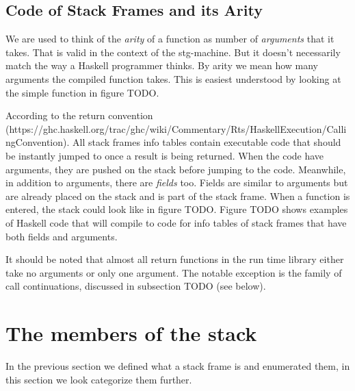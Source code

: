 




\subsection{Code of Stack Frames and its Arity}

We are used to think of the \emph{arity} of a function as number
of \emph{arguments} that it takes. That is valid in the context of the
stg-machine. But it doesn't necessarily match the way a Haskell
programmer thinks. By arity we mean how many arguments the compiled
function takes. This is easiest understood by looking at the simple function
in figure TODO.

According to the return convention (https://ghc.haskell.org/trac/ghc/wiki/Commentary/Rts/HaskellExecution/CallingConvention).
All stack frames info tables contain executable code that should be
instantly jumped to once a result is being returned. When the code
have arguments, they are pushed on the stack before jumping to the code.
Meanwhile, in addition to arguments, there are \emph{fields} too.
Fields are similar to arguments but are already placed on the stack
and is part of the stack frame. When a function is entered,
the stack could look like in figure TODO. Figure TODO shows examples
of Haskell code that will compile to code for info tables
of stack frames that have both fields and arguments.

It should be noted that almost all return functions in the run time library
either take no arguments or only one argument. The notable exception is the
family of call continuations, discussed in subsection TODO (see below).

\section{The members of the stack}

In the previous section we defined what a stack frame is and enumerated
them, in this section we look categorize them further.

